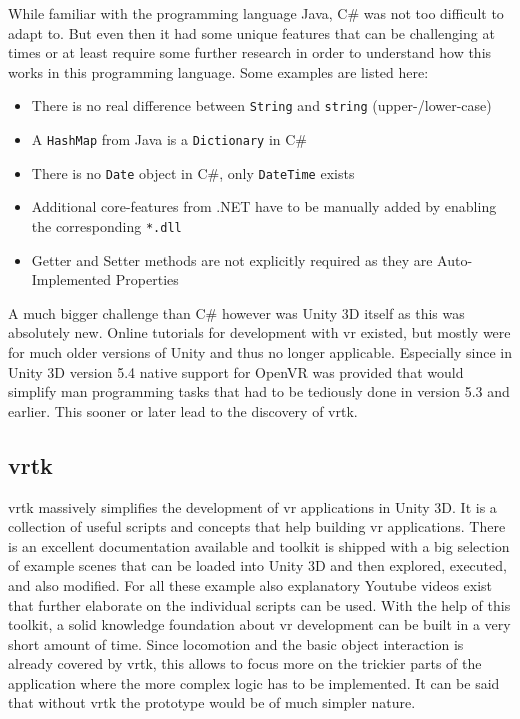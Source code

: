While familiar with the programming language Java, C\# was not too difficult to adapt to. But even then it had some unique features that can be challenging at times or at least require some further research in order to understand how this works in this programming language. Some examples are listed here:
\begin{itemize}[noitemsep,nolistsep]
	\item There is no real difference between \texttt{String} and \texttt{string} (upper-/lower-case)
	\item A \texttt{HashMap} from Java is a \texttt{Dictionary} in C\#
	\item There is no \texttt{Date} object in C\#, only \texttt{DateTime} exists
	\item Additional core-features from .NET have to be manually added by enabling the corresponding \texttt{*.dll}
	\item Getter and Setter methods are not explicitly required as they are Auto-Implemented Properties
\end{itemize}
A much bigger challenge than C\# however was Unity 3D itself as this was absolutely new. Online tutorials for development with \gls{vr} existed, but mostly were for much older versions of Unity and thus no longer applicable. Especially since in Unity 3D version 5.4 native support for OpenVR was provided that would simplify man programming tasks that had to be tediously done in version 5.3 and earlier. This sooner or later lead to the discovery of \gls{vrtk}.


\subsection{\gls{vrtk}}

\gls{vrtk} massively simplifies the development of \gls{vr} applications in Unity 3D. It is a collection of useful scripts and concepts that help building \gls{vr} applications. There is an excellent documentation available and toolkit is shipped with a big selection of example scenes that can be loaded into Unity 3D and then explored, executed, and also modified. For all these example also explanatory Youtube videos exist that further elaborate on the individual scripts can be used. With the help of this toolkit, a solid knowledge foundation about \gls{vr} development can be built in a very short amount of time. Since locomotion and the basic object interaction is already covered by \gls{vrtk}, this allows to focus more on the trickier parts of the application where the more complex logic has to be implemented. It can be said that without \gls{vrtk} the prototype would be of much simpler nature.


